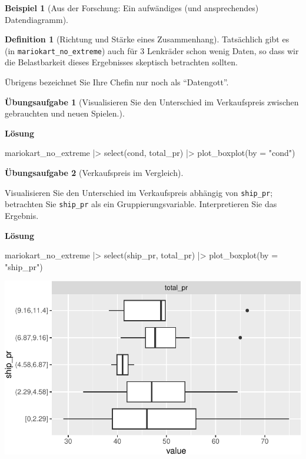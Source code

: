 \documentclass[
  a4paper,
]{scrbook}
\newenvironment{Shaded}{\begin{snugshade}}{\end{snugshade}}
\newcommand{\AttributeTok}[1]{\textcolor[rgb]{0.40,0.45,0.13}{#1}}
\newcommand{\FunctionTok}[1]{\textcolor[rgb]{0.28,0.35,0.67}{#1}}
\newcommand{\NormalTok}[1]{\textcolor[rgb]{0.00,0.23,0.31}{#1}}
\newcommand{\SpecialCharTok}[1]{\textcolor[rgb]{0.37,0.37,0.37}{#1}}
\newcommand{\StringTok}[1]{\textcolor[rgb]{0.13,0.47,0.30}{#1}}
\theoremstyle{definition}
\newtheorem{example}{Beispiel}[chapter]
\theoremstyle{definition}
\newtheorem{definition}{Definition}[chapter]
\theoremstyle{definition}
\newtheorem{exercise}{Übungsaufgabe}[chapter]
\theoremstyle{remark}
\begin{document}
\begin{example}[Aus der Forschung: Ein aufwändiges (und ansprechendes)
Datendiagramm]
\begin{definition}[Richtung und Stärke eines
Zusammenhang]
Tatsächlich gibt es (in \texttt{mariokart\_no\_extreme}) auch für 3
Lenkräder schon wenig Daten, so dass wir die Belastbarkeit dieses
Ergebnisses skeptisch betrachten sollten.

Übrigens bezeichnet Sie Ihre Chefin nur noch als ``Datengott''.

\begin{exercise}[Visualisieren Sie den Unterschied im Verkaufspreis
zwischen gebrauchten und neuen
Spielen.]\protect\hypertarget{exr-diff-plot}{}\label{exr-diff-plot}

\textbf{Lösung}

\begin{Shaded}
\begin{Highlighting}[]
\NormalTok{mariokart\_no\_extreme }\SpecialCharTok{|\textgreater{}} 
  \FunctionTok{select}\NormalTok{(cond, total\_pr) }\SpecialCharTok{|\textgreater{}} 
  \FunctionTok{plot\_boxplot}\NormalTok{(}\AttributeTok{by =} \StringTok{"cond"}\NormalTok{)}
\end{Highlighting}
\end{Shaded}

\end{exercise}

\begin{exercise}[Verkaufspreis im
Vergleich]\protect\hypertarget{exr-diff-plot}{}\label{exr-diff-plot}

Visualisieren Sie den Unterschied im Verkaufspreis abhängig von
\texttt{ship\_pr}; betrachten Sie \texttt{ship\_pr} als ein
Gruppierungsvariable. Interpretieren Sie das Ergebnis.

\textbf{Lösung}

\begin{Shaded}
\begin{Highlighting}[]
\NormalTok{mariokart\_no\_extreme }\SpecialCharTok{|\textgreater{}} 
  \FunctionTok{select}\NormalTok{(ship\_pr, total\_pr) }\SpecialCharTok{|\textgreater{}} 
  \FunctionTok{plot\_boxplot}\NormalTok{(}\AttributeTok{by =} \StringTok{"ship\_pr"}\NormalTok{)}
\end{Highlighting}
\end{Shaded}

\includegraphics{040-verbildlichen_files/figure-pdf/unnamed-chunk-41-1.pdf}


\end{exercise}
\end{definition}
\end{example}
\end{document}
